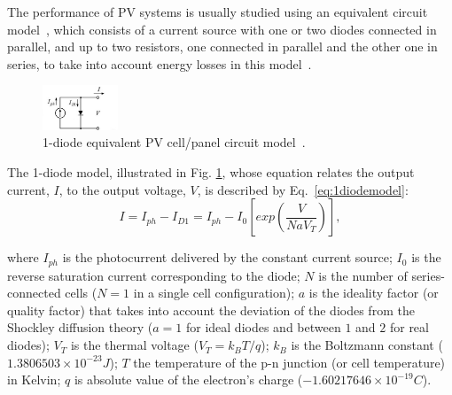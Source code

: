 \documentclass[journal]{IEEEtran}
\begin{document}
The performance of PV systems %
is usually studied using an equivalent circuit model~\cite{Yatimi,Saloux,Mellit}, which consists of a current source with one or two diodes connected in parallel, and up to two resistors, one connected in parallel and the other one in series, to take into account energy losses in this model~\cite{Cubas}. 
\begin{figure}[h]
\includegraphics[width=0.20\textwidth]{equivckt1D}
\centering
\caption{1-diode equivalent PV cell/panel circuit model~\cite{Cubas}.}
\label{fig:equivckt}
\end{figure}
 
The 1-diode model, illustrated in Fig. \ref{fig:equivckt}, whose equation relates the output current, $I$, to the output voltage, $V$, is described by Eq.~\eqref{eq:1diodemodel}:
\begin{equation}
\label{eq:1diodemodel}
I = I_{ph}-I_{D1}=I_{ph}-I_{0}\left[ exp \left( \dfrac{V}{NaV_{T}} \right)  \right], 
\end{equation}

\noindent where $I_{ph}$ is the photocurrent delivered by the constant current source; $I_{0}$ is the reverse saturation current corresponding to the diode; $N$ is the number of series-connected cells ($N=1$ in a single cell configuration); $a$ is the ideality factor (or quality factor) that takes into account the deviation of the diodes from the Shockley diffusion theory ($a=1$ for ideal diodes and between $1$ and $2$ for real diodes); $V_{T}$ is the thermal voltage ($ V_{T}=k_{B}T/q $); $ k_{B} $ is the Boltzmann constant ($ 1.3806503\times10^{-23}J $); $T$ the temperature of the p-n junction (or cell temperature) in Kelvin; $q$ is absolute value of the electron's charge ($ -1.60217646\times10^{-19}C $).
\end{document}
